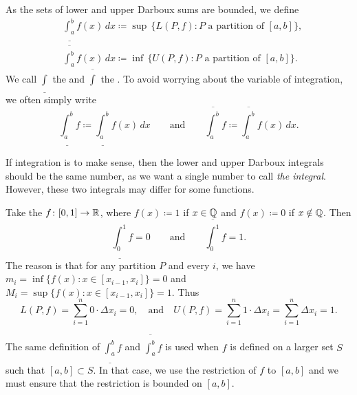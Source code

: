 \begin{defn}
As the sets of lower and upper Darboux sums are bounded, we define
\begin{align*}
& \underline{\int_a^b} f(x)\,dx \coloneqq
\sup \, \bigl\{ L(P,f) : P \text{ a partition of } [a,b] \bigr\} , \\
& \overline{\int_a^b} f(x)\,dx \coloneqq
\inf \, \bigl\{ U(P,f) : P \text{ a partition of } [a,b] \bigr\} .
\end{align*}
We call $\underline{\int}$
the \emph{} and
$\overline{\int}$ the
\emph{}.
To avoid worrying about the variable of integration, 
we often simply write
\begin{equation*}
\underline{\int_a^b} f \coloneqq
\underline{\int_a^b} f(x)\,dx 
\qquad \text{and} \qquad
\overline{\int_a^b} f \coloneqq
\overline{\int_a^b} f(x)\,dx  .
\end{equation*}
\end{defn}

If integration is to make sense, then the lower and upper Darboux
integrals should be the same number, as we want a single number to call
\emph{the integral}.  However, these two integrals may differ for
some functions.

\begin{example} \label{example:dirichletfunc}
Take the 
$f \colon [0,1] \to {\mathbb{R}}$, where $f(x) \coloneqq 1$ if
$x \in {\mathbb{Q}}$ and $f(x) \coloneqq 0$ if $x \notin {\mathbb{Q}}$.  Then
\begin{equation*}
\underline{\int_0^1} f = 0 \qquad \text{and} \qquad
\overline{\int_0^1} f = 1 .
\end{equation*}
The reason is that for any partition $P$ and every $i$, we have 
$m_i = \inf \bigl\{ f(x) : x \in [x_{i-1},x_i] \bigr\} = 0$  and
$M_i = \sup \bigl\{ f(x) : x \in [x_{i-1},x_i] \bigr\} = 1$.  Thus
\begin{equation*}
L(P,f) = \sum_{i=1}^n 0 \cdot \Delta x_i = 0 , \quad \text{and} \quad
U(P,f) = \sum_{i=1}^n 1 \cdot \Delta x_i = \sum_{i=1}^n \Delta x_i = 1  .
\end{equation*}
\end{example}

\begin{remark}
The same definition of $\underline{\int_a^b} f$ and
$\overline{\int_a^b} f$
is used when $f$ is defined on a larger set $S$ such that
$[a,b] \subset S$.  In that case, we use the restriction of $f$ to $[a,b]$
and we must ensure that the restriction is bounded on $[a,b]$.
\end{remark}

